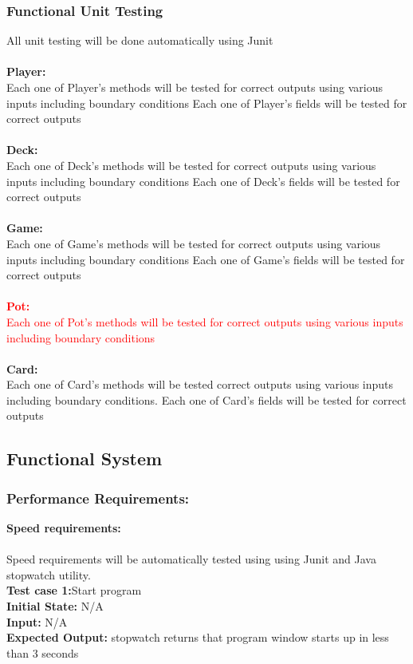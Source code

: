 \documentclass[12pt]{article}
\begin{document}
	\subsubsection{Functional Unit Testing} 
    All unit testing will be done automatically using Junit\\
    \\
    \textbf{Player: } \\
    \indent \indent Each one of Player’s methods will be tested for correct outputs
using various inputs including boundary conditions
        Each one of Player’s fields will be tested for correct outputs\\
    \\
    \textbf{Deck:} \\
	\indent \indent Each one of Deck’s methods will be tested for correct outputs
using various inputs including boundary conditions
        Each one of Deck’s fields will be tested for correct outputs\\
    \\
    \textbf{Game:} \\
	\indent \indent Each one of Game’s methods will be tested for correct outputs
using various inputs including boundary conditions
        Each one of Game’s fields will be tested for correct outputs\\
	\\
	\textcolor{red}{\textbf{Pot:} \\
	\indent \indent Each one of Pot's methods will be tested for correct outputs using various inputs including boundary conditions}\\
	\\
    \textbf{Card:}\\
	\indent \indent Each one of Card’s methods will be tested correct outputs 
using various inputs including boundary conditions. Each one of Card’s fields will be tested for correct outputs

	\subsection{Functional System}
	\subsubsection{Performance Requirements:}
	\textbf{Speed requirements:}\\
	\\
    Speed requirements will be automatically tested using using Junit and Java stopwatch utility.
	\\
	\textbf{Test case 1:}Start program\\
	\textbf{Initial State:} N/A\\
	\textbf{Input:} N/A\\
	\textbf{Expected Output:} stopwatch returns that program window starts up in less than 3 seconds\\
\end{document}
